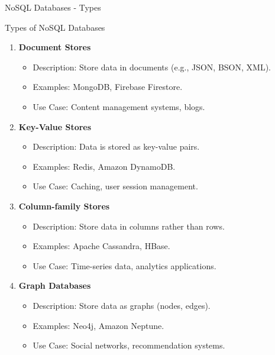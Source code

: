 \documentclass[aspectratio=169]{beamer}
\begin{document}
\begin{frame}[fragile]{NoSQL Databases - Types}
    \begin{block}{Types of NoSQL Databases}
        \begin{enumerate}
            \item \textbf{Document Stores}
                \begin{itemize}
                    \item Description: Store data in documents (e.g., JSON, BSON, XML).
                    \item Examples: MongoDB, Firebase Firestore.
                    \item Use Case: Content management systems, blogs.
                \end{itemize}
            \item \textbf{Key-Value Stores}
                \begin{itemize}
                    \item Description: Data is stored as key-value pairs.
                    \item Examples: Redis, Amazon DynamoDB.
                    \item Use Case: Caching, user session management.
                \end{itemize}
            \item \textbf{Column-family Stores}
                \begin{itemize}
                    \item Description: Store data in columns rather than rows.
                    \item Examples: Apache Cassandra, HBase.
                    \item Use Case: Time-series data, analytics applications.
                \end{itemize}
            \item \textbf{Graph Databases}
                \begin{itemize}
                    \item Description: Store data as graphs (nodes, edges).
                    \item Examples: Neo4j, Amazon Neptune.
                    \item Use Case: Social networks, recommendation systems.
                \end{itemize}
        \end{enumerate}
    \end{block}
\end{frame}
\end{document}
